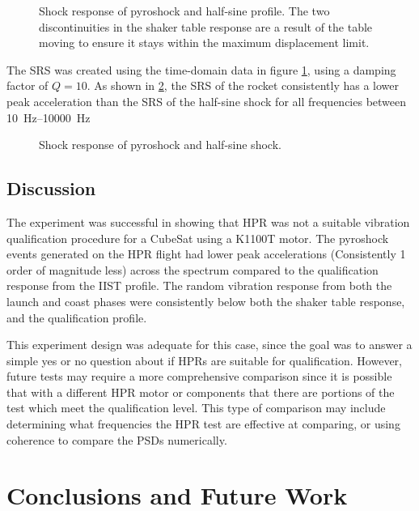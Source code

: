 \documentclass{report}
\begin{document}
\begin{figure}[H]
  \centering
  
  \caption{Shock response of pyroshock and half-sine profile. The two discontinuities in the shaker table response are a result of the table moving to ensure it stays within the maximum displacement limit.}
  \label{fig:shock-resp-result}
\end{figure}

The SRS was created using the time-domain data in figure \ref{fig:shock-resp-result}, using a damping factor of $Q=10$. As shown in \ref{fig:srs}, the SRS of the rocket consistently has a lower peak acceleration than the SRS of the half-sine shock for all frequencies between \SIrange{10}{10000}{\hertz}

\begin{figure}[H]
  \centering
  
  \caption{Shock response of pyroshock and half-sine shock.}
  \label{fig:srs}
\end{figure}

\section{Discussion}

The experiment was successful in showing that HPR was not a suitable vibration qualification procedure for a CubeSat using a K1100T motor. The pyroshock events generated on the HPR flight had lower peak accelerations (Consistently 1 order of magnitude less) across the spectrum compared to the qualification response from the IIST profile. The random vibration response from both the launch and coast phases were consistently below both the shaker table response, and the qualification profile.

This experiment design was adequate for this case, since the goal was to answer a simple yes or no question about if HPRs are suitable for qualification. However, future tests may require a more comprehensive comparison since it is possible that with a different HPR motor or components that there are portions of the test which meet the qualification level. This type of comparison may include determining what frequencies the HPR test are effective at comparing, or using coherence to compare the PSDs numerically.

\chapter{Conclusions and Future Work}
\end{document}
